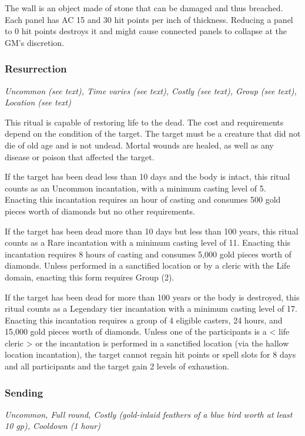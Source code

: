 The wall is an object made of stone that can be damaged and thus breached. Each panel has AC 15 and 30 hit points per inch of thickness. Reducing a panel to 0 hit points destroys it and might cause connected panels to collapse at the GM's discretion.

\subsubsection{Resurrection}
\textit{Uncommon (see text), Time varies (see text), Costly (see text), Group (see text), Location (see text)}

This ritual is capable of restoring life to the dead. The cost and requirements depend on the condition of the target. The target must be a creature that did not die of old age and is not undead. Mortal wounds are healed, as well as any disease or poison that affected the target.

If the target has been dead less than 10 days and the body is intact, this ritual counts as an Uncommon incantation, with a minimum casting level of 5. Enacting this incantation requires an hour of casting and consumes 500 gold pieces worth of diamonds but no other requirements.

If the target has been dead more than 10 days but less than 100 years, this ritual counts as a Rare incantation with a minimum casting level of 11. Enacting this incantation requires 8 hours of casting and consumes 5,000 gold pieces worth of diamonds. Unless performed in a sanctified location or by a cleric with the Life domain, enacting this form requires Group (2).

If the target has been dead for more than 100 years or the body is destroyed, this ritual counts as a Legendary tier incantation with a minimum casting level of 17. Enacting this incantation requires a group of 4 eligible casters, 24 hours, and 15,000 gold pieces worth of diamonds. Unless one of the participants is a < life cleric > or the incantation is performed in a sanctified location (via the hallow location incantation), the target cannot regain hit points or spell slots for 8 days and all participants and the target gain 2 levels of exhaustion.

\subsubsection{Sending}
\textit{Uncommon, Full round, Costly (gold-inlaid feathers of a blue bird worth at least 10 gp), Cooldown (1 hour)}

